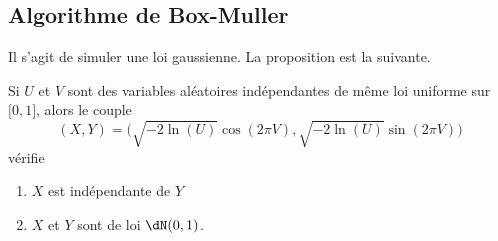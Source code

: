 \subsection{Algorithme de Box-Muller}

Il s'agit de simuler une loi gaussienne. La proposition est la suivante.

\begin{proposition}
	Si \( U\) et \( V\) sont des variables aléatoires indépendantes de même loi uniforme sur \( \mathopen[ 0 , 1 \mathclose]\), alors le couple
	\begin{equation}
		(X,Y)=\big( \sqrt{-2\ln(U)}\cos(2\pi V),\sqrt{-2\ln(U)}\sin(2\pi V) \big)
	\end{equation}
	vérifie
	\begin{enumerate}
		\item
		      \( X\) est indépendante de \( Y\)
		\item
		      \( X\) et \( Y\) sont de loi \( \dN(0,1)\).
	\end{enumerate}
\end{proposition}

